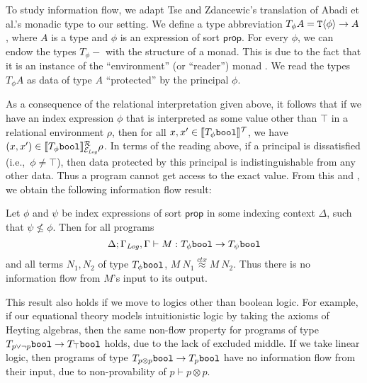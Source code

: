 To study information flow, we adapt Tse and Zdancewic's translation of
Abadi et al.'s monadic type to our setting. We define a type
abbreviation $T_\phi A = \textup{\texttt{T}}\langle \phi \rangle \to A$, where $A$ is a type
and $\phi$ is an expression of sort $\mathsf{prop}$. For every $\phi$,
we can endow the types $T_\phi-$ with the structure of a monad. This
is due to the fact that it is an instance of the ``environment'' (or
``reader'') monad \cite{jones95functional}. We read the types
$T_\phi A$ as data of type $A$ ``protected'' by the principal
$\phi$.

As a consequence of the relational interpretation given above, it
follows that if we have an index expression $\phi$ that is interpreted
as some value other than $\top$ in a relational environment $\rho$,
then for all $x,x' \in \llbracket T_\phi\textup{\texttt{bool}} \rrbracket^{\mathcal{T}}$, we have $(x,x')
\in \llbracket T_\phi\textup{\texttt{bool}} \rrbracket^{\mathcal{R}}_{\mathcal{E}_{\mathit{Log}}}{\rho}$. In
terms of the reading above, if a principal is dissatisfied
(i.e.,~$\phi \not= \top$), then data protected by this principal is
indistinguishable from any other data. Thus a program cannot get
access to the exact value. From this and , we
obtain the following information flow result:

\begin{theorem}
  Let $\phi$ and $\psi$ be index expressions of sort $\mathsf{prop}$
  in some indexing context $\Delta$, such that $\psi \not\leq
  \phi$. Then for all programs
  \begin{displaymath}
    \Delta; \Gamma_{\mathit{Log}},\Gamma \vdash M : T_\phi\textup{\texttt{bool}} \to T_\psi\textup{\texttt{bool}}
  \end{displaymath}
  and all terms $N_1,N_2$ of type $T_\phi\textup{\texttt{bool}}$, $M\ N_1
  \stackrel{ctx}\approx M\ N_2$.  Thus there is no information flow
  from $M$'s input to its output.
\end{theorem}
This result also holds if we move to logics other than boolean
logic. For example, if our equational theory models intuitionistic
logic by taking the axioms of Heyting algebras, then the same non-flow
property for programs of type $T_{p\lor\lnot p}\textup{\texttt{bool}} \to
T_\top\textup{\texttt{bool}}$ holds, due to the lack of excluded middle. If
we take linear logic, then programs of type $T_{p\otimes
  p}\textup{\texttt{bool}} \to T_p\textup{\texttt{bool}}$ have no information flow
from their input, due to non-provability of $p \vdash p \otimes p$.



